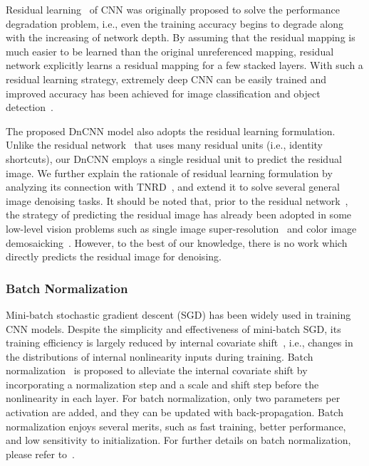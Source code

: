 \documentclass[journal]{IEEEtran}
\begin{document}
Residual learning~\cite{he2015deep} of CNN was originally proposed to solve the performance degradation problem, i.e., even the training accuracy begins to degrade along with the increasing of network depth. By assuming that the residual mapping is much easier to be learned than the original unreferenced mapping, residual network explicitly  learns a residual mapping for a few stacked layers. With such a residual learning strategy, extremely deep CNN can be easily trained and improved accuracy has been achieved for image classification and object detection~\cite{he2015deep}.

The proposed DnCNN model also adopts the residual learning formulation. Unlike the residual network~\cite{he2015deep} that uses many residual units (i.e., identity shortcuts), our DnCNN employs a single residual unit to predict the residual image. We further explain the rationale of residual learning formulation by analyzing its connection with TNRD~\cite{chen2015trainable}, and extend it to solve several general image denoising tasks. It should be noted that, prior to the residual network~\cite{he2015deep}, the strategy of predicting the residual image has already been adopted in some low-level vision problems such as single image super-resolution~\cite{timofte2014a} and color image demosaicking~\cite{kiku2013residual}.
However, to the best of our knowledge, there is no work which directly predicts the residual image for denoising.


\subsubsection{Batch Normalization}

Mini-batch stochastic gradient descent (SGD) has been widely used in training CNN models. Despite the simplicity and effectiveness of mini-batch SGD, its training efficiency is largely reduced by internal covariate shift~\cite{ioffe2015batch}, i.e., changes in the distributions of internal nonlinearity inputs during training. Batch normalization~\cite{ioffe2015batch} is proposed to alleviate the internal covariate shift by incorporating a normalization step and a scale and shift step before the nonlinearity in each layer. For batch normalization, only two parameters per activation are added, and they can be updated with back-propagation.  Batch normalization enjoys several merits, such as fast training, better performance, and low sensitivity to initialization. For further details on batch normalization, please refer to~\cite{ioffe2015batch}.
\end{document}
